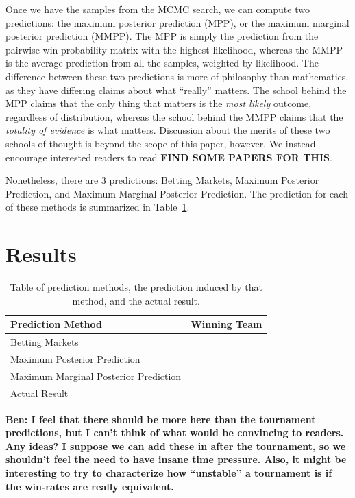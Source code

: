 \documentclass{article}
\begin{document}
Once we have the samples from the MCMC search, we can compute two predictions: the maximum posterior prediction (MPP),
or the maximum marginal posterior prediction (MMPP). The MPP is simply the prediction from the pairwise win probability
matrix with the highest likelihood, whereas the MMPP is the average prediction from all the samples, weighted by
likelihood. The difference between these two predictions is more of philosophy than mathematics, as they have differing
claims about what ``really'' matters. The school behind the MPP claims that the only thing that matters is the
\textit{most likely} outcome, regardless of distribution, whereas the school behind the MMPP claims that the
\textit{totality of evidence} is what matters. Discussion about the merits of these two schools of thought is beyond the
scope of this paper, however. We instead encourage interested readers to read \textbf{FIND SOME PAPERS FOR THIS}.

Nonetheless, there are 3 predictions: Betting Markets, Maximum Posterior Prediction, and Maximum Marginal Posterior
Prediction. The prediction for each of these methods is summarized in Table~\ref{table:predictions}.

\section{Results}

\begin{table}[ht]
  \centering
  \begin{tabular}{l || r}
    Prediction Method & Winning Team\\
    \hline
    Betting Markets & \\
    Maximum Posterior Prediction & \\
    Maximum Marginal Posterior Prediction & \\
    Actual Result & \\
  \end{tabular}
  \caption{Table of prediction methods, the prediction induced by that method, and the actual result.}
  \label{table:predictions}
\end{table}


\textbf{Ben: I feel that there should be more here than the tournament predictions, but I can't think of what would be
convincing to readers. Any ideas? I suppose we can add these in after the tournament, so we shouldn't feel the need to
have insane time pressure. Also, it might be interesting to try to characterize how ``unstable'' a tournament is if the
win-rates are really equivalent.}
\end{document}
